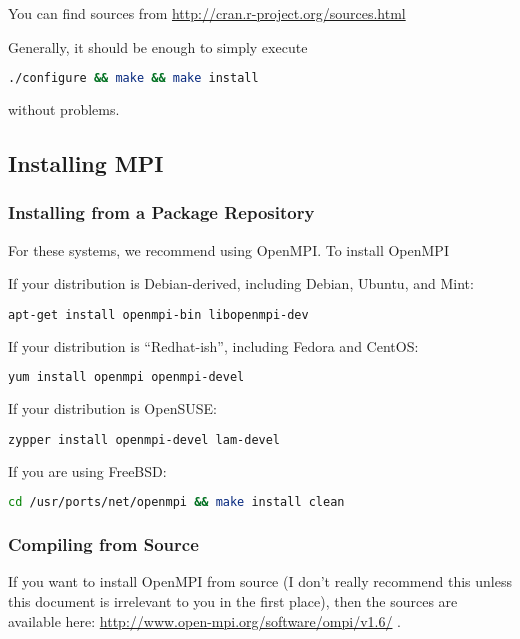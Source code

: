 You can find  sources from \url{http://cran.r-project.org/sources.html}

Generally, it should be enough to simply execute
\begin{lstlisting}[language=sh]
./configure && make && make install
\end{lstlisting}
without problems.









\subsection{Installing MPI}

\subsubsection{Installing from a Package Repository}

For these systems, we recommend using OpenMPI.  To install OpenMPI

If your distribution is Debian-derived, including Debian, Ubuntu, and Mint:
\begin{lstlisting}[language=sh]
apt-get install openmpi-bin libopenmpi-dev
\end{lstlisting}

\vspace{.4cm}
If your distribution is ``Redhat-ish'', including Fedora and CentOS:
\begin{lstlisting}[language=sh]
yum install openmpi openmpi-devel
\end{lstlisting}

\vspace{.4cm}
If your distribution is OpenSUSE:
\begin{lstlisting}[language=sh]
zypper install openmpi-devel lam-devel
\end{lstlisting}

\vspace{.4cm}
If you are using FreeBSD:
\begin{lstlisting}[language=sh]
cd /usr/ports/net/openmpi && make install clean
\end{lstlisting}



\subsubsection{Compiling from Source}
If you want to install OpenMPI from source (I don't really recommend this unless this document is irrelevant to you in the first place), then the sources are available here:  \url{http://www.open-mpi.org/software/ompi/v1.6/} .









